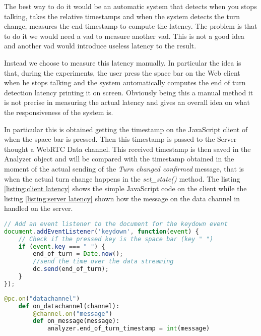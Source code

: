 \documentclass[../main.tex]{subfiles}
\begin{document}
The best way to do it would be an automatic system that detects when you stops talking, takes the relative timestamps and when the system detects the turn change, measures the end timestamp to compute the latency. The problem is that to do it we would need a vad to measure another vad. This is not a good idea and another vad would introduce useless latency to the result.

Instead we choose to measure this latency manually. In particular the idea is that, during the experiments, the user press the space bar on the Web client when he stops talking and the system automatically computes the end of turn detection latency printing it on screen. Obviously being this a manual method it is not precise in measuring the actual latency and gives an overall idea on what the responsiveness of the system is. 

In particular this is obtained getting the timestamp on the JavaScript client of when the space bar is pressed. Then this timestamp is passed to the Server thought a WebRTC Data channel. This received timestamp is then saved in the Analyzer object and will be compared with the timestamp obtained in the moment of the actual sending of the \textit{Turn changed confirmed} message, that is when the actual turn change happens in the \textit{set\_state()} method. The listing \ref{listing:client latency} shows the simple JavaScript code on the client while the listing \ref{listing:server latency} shown how the message on the data channel in handled on the server.

\begin{lstlisting}[language=JavaScript, caption={Client implementation of the method to take the timestamp}]
// Add an event listener to the document for the keydown event
document.addEventListener('keydown', function(event) {
    // Check if the pressed key is the space bar (key " ")
    if (event.key === " ") {
        end_of_turn = Date.now();
        //send the time over the data streaming
        dc.send(end_of_turn);
    }
});
\end{lstlisting}
\label{listing:client latency}

\begin{lstlisting}[language=Python, caption={Server handling of the client timestamp}]
@pc.on("datachannel")
    def on_datachannel(channel):
        @channel.on("message")
        def on_message(message):
            analyzer.end_of_turn_timestamp = int(message)
\end{lstlisting}
\label{listing:server latency}
\end{document}
